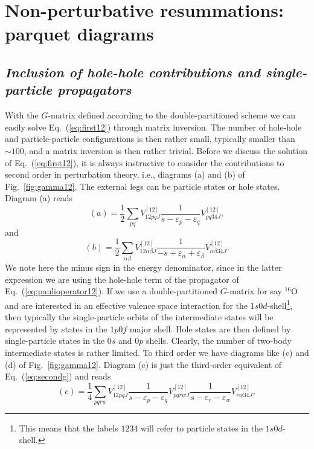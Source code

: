 \documentclass[twoside,12pt]{article}
\begin{document}
\section{Non-perturbative resummations: parquet diagrams}
\label{sec:sec5}

\subsection{\it Inclusion of hole-hole contributions and single-particle propagators}

With the $G$-matrix defined according
to the double-partitioned scheme we can easily solve Eq.\ (\ref{eq:first12})
through matrix inversion. The number of hole-hole and particle-particle
configurations is then rather small, typically smaller than
$\sim  100$, and a matrix inversion
is then rather trivial.
Before we discuss the solution of Eq.\ (\ref{eq:first12}), it is always
instructive to consider the contributions to second order in
perturbation theory, i.e., diagrams (a) and (b) of Fig.\
\ref{fig:gamma12}. The external legs can be
particle states or hole states. Diagram (a) reads
\begin{equation}
      (a)=\frac{1}{2}\sum_{pq}V^{[12]}_{12pq J}
      \frac{1}{s-\varepsilon_p-
                \varepsilon_q} V^{[12]}_{pq34 J},
      \label{eq:secondg}
\end{equation}
and
\begin{equation}
      (b)=\frac{1}{2}\sum_{\alpha\beta}V^{[12]}_{12\alpha\beta J}
      \frac{1}{-s+\varepsilon_{\alpha}+
                \varepsilon_{\beta}} V^{[12]}_{\alpha\beta 34 J}.
\end{equation}
We note here the minus sign in the energy denominator,
since in the latter expression we are using
the hole-hole term of the propagator of
Eq.\ (\ref{eq:paulioperator12}).
If we use a double-partitioned $G$-matrix for say $^{16}$O and
are interested in an effective valence space interaction
for the $1s0d$-shell\footnote{This means that the labels $1234$ will
refer to particle states in the $1s0d$-shell.}, then typically
the single-particle orbits of the intermediate states will be represented
by states in the $1p0f$ major shell. Hole states are then defined
by single-particle states in the $0s$ and $0p$ shells.
Clearly, the number of two-body intermediate states is rather limited.
To third order we have diagrams like (c) and (d) of Fig.\
\ref{fig:gamma12}. Diagram (c) is just the third-order equivalent of
Eq.\ (\ref{eq:secondg}) and reads
\begin{equation}
      (c)=\frac{1}{4}\sum_{pqrw}V^{[12]}_{12pq J}
      \frac{1}{s-\varepsilon_p-
                \varepsilon_q}
      V^{[12]}_{pqrw J}
      \frac{1}{s-\varepsilon_r-
                \varepsilon_w}
       V^{[12]}_{rw34 J},
      \label{eq:thirdg}
\end{equation}
\end{document}
